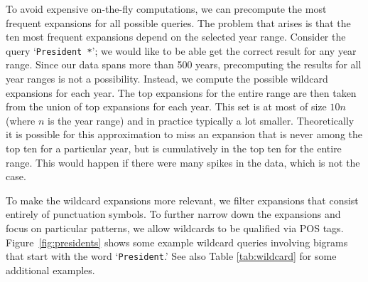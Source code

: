 \documentclass[11pt,a4paper]{article}
\newcommand{\query}[1]{\texttt{#1}}
\begin{document}
 To avoid expensive on-the-fly computations, we can precompute the most frequent expansions for all possible queries. The problem that arises is that the ten most frequent expansions depend on the selected year range. Consider the query `\query{President *}'; we would like to be able get the correct result for any year range. Since our data spans more than 500 years, precomputing the results for all year ranges is not a possibility. Instead, we compute the possible wildcard expansions for each year. The top expansions for the entire range are then taken from the union of top expansions for each year. This set is at most of size $10n$ (where $n$ is the year range) and in practice typically a lot smaller. Theoretically it is possible for this approximation to miss an expansion that is never among the top ten for a particular year, but is cumulatively in the top ten for the entire range. This would happen if there were many spikes in the data, which is not the case.

	To make the wildcard expansions more relevant, we filter expansions that consist entirely of punctuation symbols. To further narrow down the expansions and focus on particular patterns, we allow wildcards to be qualified via POS tags. Figure~\ref{fig:presidents} shows some example wildcard queries involving bigrams that start with the word `\query{President}.' See also Table \ref{tab:wildcard} for some additional examples.
\end{document}
